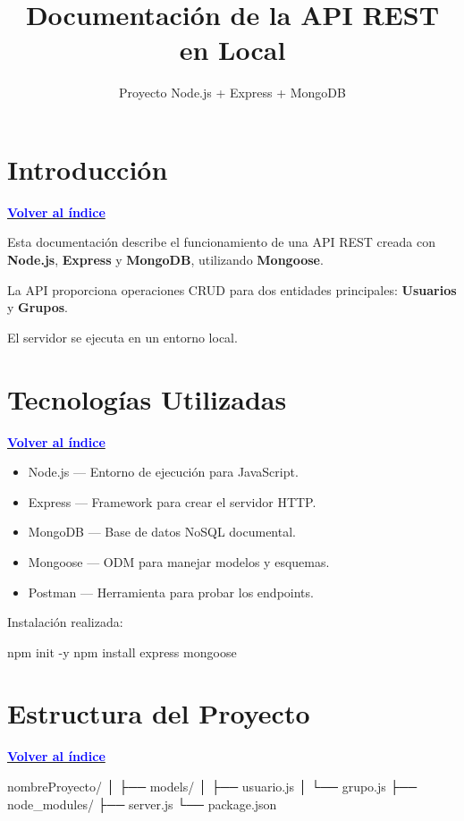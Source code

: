 \documentclass[12pt,a4paper]{article}
\title{Documentación de la API REST en Local}
\author{Proyecto Node.js + Express + MongoDB}
\date{}
\newcommand{\volverindice}{\noindent\hyperlink{toc}{\textcolor{blue}{\textbf{Volver al índice}}}\par\vspace{0.5cm}}
\begin{document}
\maketitle
\newpage
\hypertarget{toc}{}
\tableofcontents
\newpage

\section{Introducción}
\volverindice

Esta documentación describe el funcionamiento de una API REST creada con \textbf{Node.js}, \textbf{Express} y \textbf{MongoDB}, utilizando \textbf{Mongoose}.

La API proporciona operaciones CRUD para dos entidades principales: \textbf{Usuarios} y \textbf{Grupos}.

El servidor se ejecuta en un entorno local.

\section{Tecnologías Utilizadas}
\volverindice

\begin{itemize}
    \item Node.js — Entorno de ejecución para JavaScript.
    \item Express — Framework para crear el servidor HTTP.
    \item MongoDB — Base de datos NoSQL documental.
    \item Mongoose — ODM para manejar modelos y esquemas.
    \item Postman — Herramienta para probar los endpoints.
\end{itemize}

Instalación realizada:

\begin{codeblock}[language=bash]
npm init -y
npm install express mongoose
\end{codeblock}

\newpage

\section{Estructura del Proyecto}
\volverindice

\begin{codeblock}[language=]
nombreProyecto/
│
├── models/
│   ├── usuario.js
│   └── grupo.js
├── node_modules/
├── server.js
└── package.json
\end{codeblock}
\end{document}
